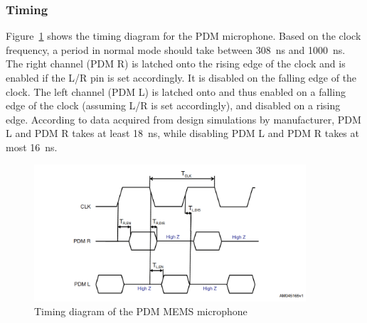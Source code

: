 \subsubsection{Timing}

Figure~\ref{fig:pdm_timing} shows the timing diagram for the PDM microphone.
Based on the clock frequency, a period in normal mode should take between \SI{308}{\nano\second} and \SI{1000}{\nano\second}.
The right channel (PDM R) is latched onto the rising edge of the clock and is enabled if the L/R pin is set accordingly.
It is disabled on the falling edge of the clock.
The left channel (PDM L) is latched onto and thus enabled on a falling edge of the clock (assuming L/R is set accordingly),
and disabled on a rising edge.
According to data acquired from design simulations by manufacturer,
PDM L and PDM R takes at least \SI{18}{\nano\second}, while disabling PDM L and PDM R takes at most \SI{16}{\nano\second}.


\begin{figure}[htb]
    \centering
    \includegraphics[width=0.9\textwidth]{figures/pdm_timing.png}
    \caption[Timing diagram of the MP34DT01-M PDM MEMS mic \cite{pdm_mic_datasheet}]{Timing diagram of the PDM MEMS microphone}
    \label{fig:pdm_timing}
\end{figure}
